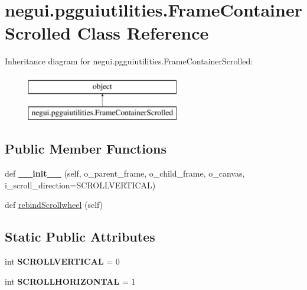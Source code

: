 \hypertarget{classnegui_1_1pgguiutilities_1_1FrameContainerScrolled}{}\section{negui.\+pgguiutilities.\+Frame\+Container\+Scrolled Class Reference}
\label{classnegui_1_1pgguiutilities_1_1FrameContainerScrolled}
Inheritance diagram for negui.\+pgguiutilities.\+Frame\+Container\+Scrolled\+:\begin{figure}[H]
\begin{center}
\leavevmode
\includegraphics[height=2.000000cm]{classnegui_1_1pgguiutilities_1_1FrameContainerScrolled}
\end{center}
\end{figure}
\subsection*{Public Member Functions}
\begin{DoxyCompactItemize}
\item 
def {\bfseries \+\_\+\+\_\+init\+\_\+\+\_\+} (self, o\+\_\+parent\+\_\+frame, o\+\_\+child\+\_\+frame, o\+\_\+canvas, i\+\_\+scroll\+\_\+direction=S\+C\+R\+O\+L\+L\+V\+E\+R\+T\+I\+C\+AL)\hypertarget{classnegui_1_1pgguiutilities_1_1FrameContainerScrolled_a6e6e85912ffe9db1e258483327c8c7bb}{}\label{classnegui_1_1pgguiutilities_1_1FrameContainerScrolled_a6e6e85912ffe9db1e258483327c8c7bb}

\item 
def \hyperlink{classnegui_1_1pgguiutilities_1_1FrameContainerScrolled_afcc54f75cc509614a3d265d6578cc147}{rebind\+Scrollwheel} (self)
\end{DoxyCompactItemize}
\subsection*{Static Public Attributes}
\begin{DoxyCompactItemize}
\item 
int {\bfseries S\+C\+R\+O\+L\+L\+V\+E\+R\+T\+I\+C\+AL} = 0\hypertarget{classnegui_1_1pgguiutilities_1_1FrameContainerScrolled_ab9206d87d03f06b9ebfc7e93460aba30}{}\label{classnegui_1_1pgguiutilities_1_1FrameContainerScrolled_ab9206d87d03f06b9ebfc7e93460aba30}

\item 
int {\bfseries S\+C\+R\+O\+L\+L\+H\+O\+R\+I\+Z\+O\+N\+T\+AL} = 1\hypertarget{classnegui_1_1pgguiutilities_1_1FrameContainerScrolled_af674b82923a9232afeba8f2512727bbf}{}\label{classnegui_1_1pgguiutilities_1_1FrameContainerScrolled_af674b82923a9232afeba8f2512727bbf}

\end{DoxyCompactItemize}


